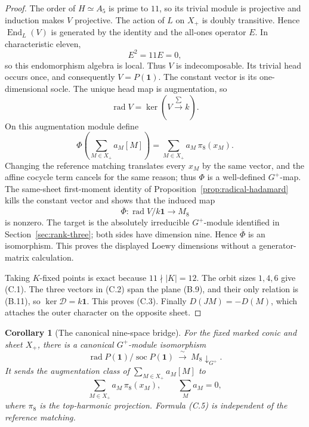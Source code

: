 \documentclass[11pt]{article}
\newtheorem{corollary}[theorem]{Corollary}
\theoremstyle{definition}
\theoremstyle{remark}
\begin{document}
\begin{proof}
The order of $H\simeq A_5$ is prime to $11$, so its trivial module is
projective and induction makes $V$ projective.  The action of $L$ on
$X_+$ is doubly transitive.  Hence $\operatorname{End}_L(V)$ is
generated by the identity and the all-ones operator $E$.  In
characteristic eleven,
\[
 E^2=11E=0,
\]
so this endomorphism algebra is local.  Thus $V$ is indecomposable.  Its
trivial head occurs once, and consequently $V=P(\mathbf1)$.  The
constant vector is its one-dimensional socle.  The unique head map is
augmentation, so
\[
 \operatorname{rad}V=\ker\!\left(V\xrightarrow{\sum}k\right).
\]
On this augmentation module define
\[
 \Phi\!\left(\sum_{M\in X_+}a_M[M]\right)
   =\sum_{M\in X_+}a_M\,\pi_8(x_M).
\]
Changing the reference matching translates every \(x_M\) by the same
vector, and the affine cocycle term cancels for the same reason; thus
\(\Phi\) is a well-defined \(G^+\)-map.  The same-sheet first-moment
identity of Proposition~\ref{prop:radical-hadamard} kills the constant
vector and shows that the induced map
\[
 \overline\Phi:\operatorname{rad}V/k\mathbf1\longrightarrow M_8
\]
is nonzero.  The target is the absolutely irreducible \(G^+\)-module
identified in Section~\ref{sec:rank-three}; both sides have dimension
nine.  Hence \(\overline\Phi\) is an isomorphism.  This proves the
displayed Loewy dimensions without a generator-matrix calculation.

Taking $K$-fixed points is exact because $11\nmid |K|=12$.  The orbit
sizes $1,4,6$ give (C.1).  The three vectors in (C.2) span the plane
 (B.9), and their only relation is (B.11), so
$\ker\mathcal D=k\mathbf1$.  This proves (C.3).  Finally
$D(JM)=-D(M)$, which attaches the outer character on the opposite
sheet.
\end{proof}

\begin{corollary}[The canonical nine-space bridge]
\label{cor:h3-nine-space-bridge}
For the fixed marked conic and sheet \(X_+\), there is a canonical
\(G^+\)-module isomorphism
\[
 \operatorname{rad}P(\mathbf1)/\operatorname{soc}P(\mathbf1)
 \ \xrightarrow{\ \sim\ }\ M_8\!\downarrow_{G^+}.             \tag{C.4}
\]
It sends the augmentation class of
\(\sum_{M\in X_+}a_M[M]\) to
\[
 \sum_{M\in X_+}a_M\,\pi_8(x_M),
 \qquad \sum_Ma_M=0,                                         \tag{C.5}
\]
where \(\pi_8\) is the top-harmonic projection.  Formula (C.5) is
independent of the reference matching.
\end{corollary}
\end{document}

